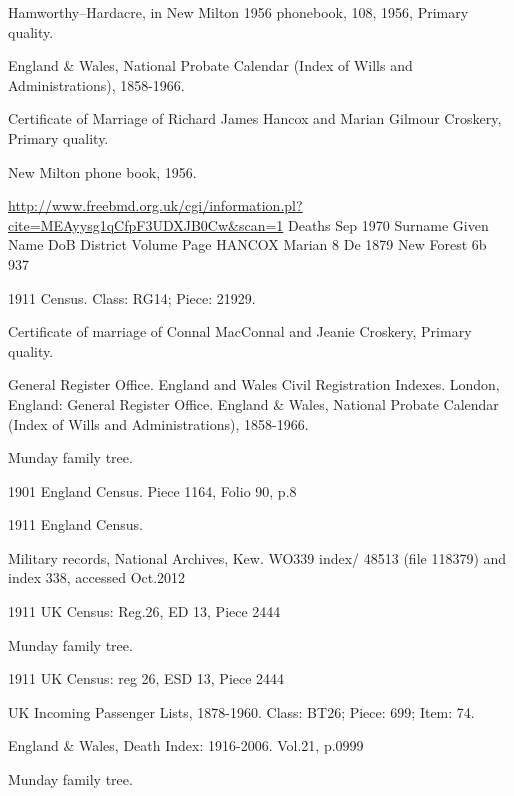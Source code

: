 \begin{thebibliography}{99}
	Hamworthy--Hardacre, in New Milton 1956 phonebook, 108, 1956, Primary quality.
	
	England \& Wales, National Probate Calendar (Index of Wills and Administrations), 1858-1966.
	 
	Certificate of Marriage of Richard James Hancox and Marian Gilmour Croskery, Primary quality.
	
	New Milton phone book, 1956. 
	
	\url{http://www.freebmd.org.uk/cgi/information.pl?cite=MEAyysg1qCfpF3UDXJB0Cw&scan=1}
	Deaths Sep 1970
	Surname     Given Name      DoB         District    Volume      Page    
	HANCOX      Marian          8 De 1879   New Forest  6b          937
	
	1911 Census. Class: RG14; Piece: 21929.
	
	Certificate of marriage of Connal MacConnal and Jeanie Croskery, Primary quality.
	
	General Register Office. England and Wales Civil Registration Indexes. London, England: General Register Office.
	England \& Wales, National Probate Calendar (Index of Wills and Administrations), 1858-1966. 
	
	Munday family tree. 
	
	 1901 England Census. Piece 1164, Folio 90, p.8

	1911 England Census.
	
	Military records, National Archives, Kew.
	WO339 index/ 48513 (file 118379) and index 338, accessed Oct.2012
	
	1911 UK Census: Reg.26, ED 13, Piece 2444 
	
	Munday family tree. 
	
	1911 UK Census: reg 26, ESD 13, Piece 2444 
	
	 UK Incoming Passenger Lists, 1878-1960. Class: BT26; Piece: 699; Item: 74.
	 
	England \& Wales, Death Index: 1916-2006. Vol.21, p.0999
	
	Munday family tree. 


\end{thebibliography}

